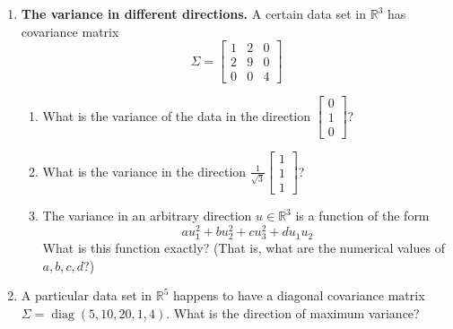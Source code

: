 \documentclass{article}
\begin{document}
\begin{enumerate}
\item \textbf{The variance in different directions.} A certain data set in $\mathbb{R}^{3}$ has covariance matrix
    \[
    \Sigma = \begin{bmatrix}
    1 & 2 & 0 \\
    2 & 9 & 0 \\
    0 & 0 & 4
    \end{bmatrix}
    \]
    \begin{enumerate}
    \item What is the variance of the data in the direction $\begin{bmatrix}0 \\ 1 \\ 0\end{bmatrix}$?
    \item What is the variance in the direction $\frac{1}{\sqrt{3}}\begin{bmatrix}1 \\ 1 \\ 1\end{bmatrix}$?
    \item The variance in an arbitrary direction $u \in \mathbb{R}^{3}$ is a function of the form
        \[
        a u_{1}^{2} + b u_{2}^{2} + c u_{3}^{2} + d u_{1} u_{2}
        \]
        What is this function exactly? (That is, what are the numerical values of $a, b, c, d$?)
    \end{enumerate}

\item A particular data set in $\mathbb{R}^{5}$ happens to have a diagonal covariance matrix $\Sigma = \operatorname{diag}(5, 10, 20, 1, 4)$. What is the direction of maximum variance?


\end{enumerate}
\end{document}

